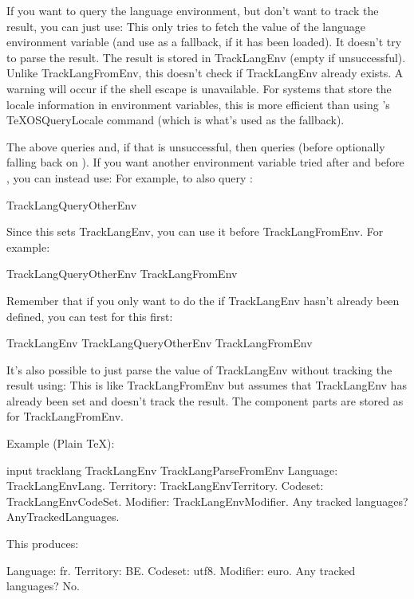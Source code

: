 \documentclass[titlepage=false,oneside,
 fontsize=12pt,captions=tableheading]{scrbook}
\begin{document}
If you want to query the language environment, but don't
want to track the result, you can just use:
This only tries to fetch the value of the
language environment variable (and use  as
a fallback, if it has been loaded). It doesn't try to parse the 
result. The result is stored in \gls{TrackLangEnv} (empty if 
unsuccessful). Unlike \gls{TrackLangFromEnv}, this doesn't check if
\gls{TrackLangEnv} already exists. A warning will occur if the shell
escape is unavailable. For systems that store the locale information in
environment variables, this is more efficient than using
's \gls{TeXOSQueryLocale} command (which is what's
used as the fallback).

The above queries  and, if that is unsuccessful,
then queries  (before optionally falling back on 
). If you want another environment
variable tried after  and before ,
you can instead use:
For example, to also query :
\begin{codebox}
\gls{TrackLangQueryOtherEnv}
\end{codebox}

Since this sets \gls{TrackLangEnv}, you can use it before
\gls{TrackLangFromEnv}. For example:
\begin{codebox}
\gls{TrackLangQueryOtherEnv}
\gls{TrackLangFromEnv}
\end{codebox}
Remember that if you only want to do the  if
\gls{TrackLangEnv} hasn't already been defined, you can test for this
first:
\begin{codebox}
\gls{TrackLangEnv}
  \gls{TrackLangQueryOtherEnv}
\gls{TrackLangFromEnv}
\end{codebox}

It's also possible to just parse the value of \gls{TrackLangEnv}
without tracking the result using:
This is like \gls{TrackLangFromEnv} but assumes that 
\gls{TrackLangEnv} has already been set and doesn't track the 
result. The component parts are stored as for \gls{TrackLangFromEnv}.

Example (Plain \TeX):
\begin{codebox}
\gls{input} tracklang
\codepar
{}\gls{TrackLangEnv}
\codepar
\gls{TrackLangParseFromEnv}
\codepar
Language: \gls{TrackLangEnvLang}.
Territory: \gls{TrackLangEnvTerritory}.
Codeset: \gls{TrackLangEnvCodeSet}.
Modifier: \gls{TrackLangEnvModifier}.
Any tracked languages? \gls{AnyTrackedLanguages}.
\end{codebox}
This produces:
\begin{resultbox}
Language: fr. Territory: BE.  Codeset: utf8.  Modifier: euro.
Any tracked languages? No.
\end{resultbox}
\end{document}
